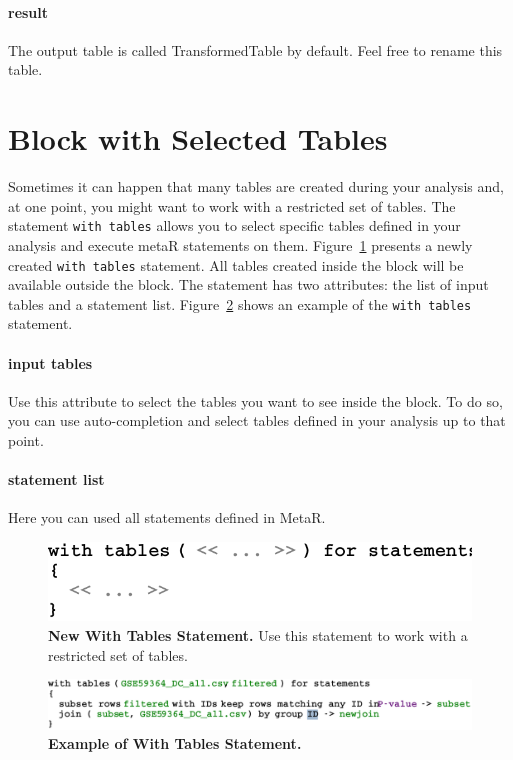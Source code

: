\paragraph{result}
The output table is called TransformedTable by default. Feel free to rename this table.


\section{Block with Selected Tables}
Sometimes it can happen that many tables are created during your analysis and, at one point, you might want to work with a restricted set of tables.
The statement \texttt{with tables} allows you to select specific tables defined in your analysis and execute metaR statements on them.
Figure~\ref{fig:NewWithTablesStatement} presents a newly created \texttt{with tables} statement. All tables created inside the block will be available outside the block.
The statement has two attributes: the list of input tables and a statement list. Figure~\ref{fig:ExampleWithTablesStatement} shows an example of the \texttt{with tables} statement.

\paragraph{input tables}
Use this attribute to select the tables you want to see inside the block. To do so, you can use auto-completion and select tables defined in your analysis up to that point.

\paragraph{statement list}
Here you can used all statements defined in MetaR.
 
\begin{figure}
  \centering
  \includegraphics[width=\figWidthNarrow]{figures/NewWithTablesStatement.pdf}
\caption[New With Tables Statement.]{\textbf{New With Tables Statement.} Use this statement to work with a restricted set of tables.}
\label{fig:NewWithTablesStatement}
\end{figure}

 \begin{figure}
  \centering
  \includegraphics[width=\figWidthWide]{figures/ExampleWithTablesStatement.pdf}
\caption[Example of With Tables Statement.]{\textbf{Example of With Tables Statement.}}
\label{fig:ExampleWithTablesStatement}
\end{figure}

